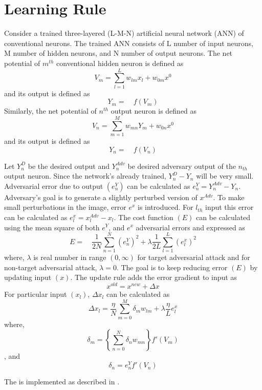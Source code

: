 \section{Learning Rule}

    Consider a trained three-layered (L-M-N) artificial neural network (ANN) of conventional neurons. The trained ANN consists of L number of input neurons, M number of hidden neurons, and N number of output neurons. The net potential of $m^{th}$ conventional hidden neuron is defined as 
    \begin{equation}
        V_m = \sum \limits_{l=1}^{L} w_{lm}x_{l} + w_{0m}x^{0}
    \end{equation}
    and its output is defined as 
    \begin{equation}
        Y_m = \quad f(V_m)
    \end{equation}
    Similarly, the net potential of $n^{th}$ output neuron is defined as
    \begin{equation}
        V_n = \sum \limits_{m=1}^{M} w_{mn}Y_{m} + w_{0n}x^{0}
    \end{equation}
    and its output is defined as 
    \begin{equation}
        Y_n = \quad f(V_n)
    \end{equation}

    Let $Y_n^D$ be the desired output and $Y_n^{Adv}$ be desired adversary output of the $n_{th}$ output neuron. Since the network's already trained, $Y_n^D - Y_n$ will be very small. Adversarial error due to output $(e_n^Y)$ can be calculated as $e_n^Y = Y_n^{Adv} - Y_n$. Adversary's goal is to generate a slightly perturbed version of $x^{Adv}$. To make small perturbations in the image, error $e^x$ is introduced. For $l_{th}$ input this error can be calculated as $e_l^x = x_l^{Adv} - x_l$. The cost function $(E)$ can be calculated using the mean square of both $e^Y$, and $e^x$ adversarial errors and expressed as
    \begin{equation}\label{eqn:error_function}
        E = \quad \frac{1}{2N} \sum \limits_{n=1}^{N} (e_n^Y)^{2} + \lambda \frac{1}{2L} \sum \limits_{l=1}^{L} (e_l^x)^{2}
    \end{equation}
    where, $\lambda$ is real number in range $(0,\infty)$ for target adversarial attack and for non-target adversarial attack, $\lambda = 0$. The goal is to keep reducing error $(E)$ by updating input $(x)$. The update rule adds the error gradient to input as 
    \begin{equation}\label{eqn:input_update_rule}
        x^{old} = x^{new} + \Delta x
    \end{equation} 
    For particular input $(x_l)$, $\Delta x_l$ can be calculated as
    \begin{equation}\label{eqn:delta_x_l}
        \Delta x_l= \frac{\eta}{N} \sum \limits_{m=0}^{M} \delta_{m} w_{lm} + \lambda \frac{\eta}{L} e_l^x
    \end{equation} 
    where, $$\delta_{m} = \left\{ \sum \limits_{n=0}^{N} \delta_{n} w_{mn} \right\} f'(V_m)$$, and $$\delta_{n} = e_n^Y f'(V_n)$$

    The  is implemented as described in .

